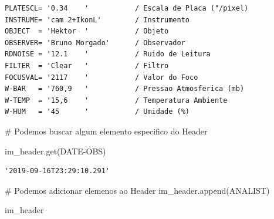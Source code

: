 \documentclass[
  letterpaper,
  DIV=11,
  numbers=noendperiod]{scrreprt}
\newenvironment{Shaded}{\begin{snugshade}}{\end{snugshade}}
\newcommand{\CommentTok}[1]{\textcolor[rgb]{0.37,0.37,0.37}{#1}}
\newcommand{\NormalTok}[1]{\textcolor[rgb]{0.00,0.23,0.31}{#1}}
\newcommand{\StringTok}[1]{\textcolor[rgb]{0.13,0.47,0.30}{#1}}
\begin{document}
\begin{verbatim}
PLATESCL= '0.34    '           / Escala de Placa ("/pixel)                      
INSTRUME= 'cam 2+IkonL'        / Instrumento                                    
OBJECT  = 'Hektor  '           / Objeto                                         
OBSERVER= 'Bruno Morgado'      / Observador                                     
RDNOISE = '12.1    '           / Ruido de Leitura                               
FILTER  = 'Clear   '           / Filtro                                         
FOCUSVAL= '2117    '           / Valor do Foco                                  
W-BAR   = '760,9   '           / Pressao Atmosferica (mb)                       
W-TEMP  = '15,6    '           / Temperatura Ambiente                           
W-HUM   = '45      '           / Umidade (%)                                    
\end{verbatim}

\begin{Shaded}
\begin{Highlighting}[]
\CommentTok{\# Podemos buscar algum elemento especifico do Header}

\NormalTok{im\_header.get(}\StringTok{\textquotesingle{}DATE{-}OBS\textquotesingle{}}\NormalTok{)}
\end{Highlighting}
\end{Shaded}

\begin{verbatim}
'2019-09-16T23:29:10.291'
\end{verbatim}

\begin{Shaded}
\begin{Highlighting}[]
\CommentTok{\# Podemos adicionar elemenos ao Header}
\NormalTok{im\_header.append(}\StringTok{\textquotesingle{}ANALIST\textquotesingle{}}\NormalTok{)}
\end{Highlighting}
\end{Shaded}

\begin{Shaded}
\begin{Highlighting}[]
\NormalTok{im\_header}
\end{Highlighting}
\end{Shaded}
\end{document}
